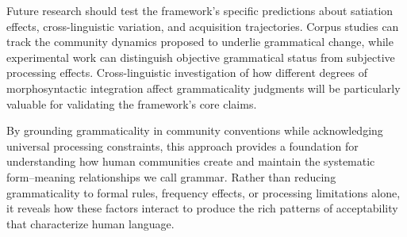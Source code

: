 \documentclass[12pt]{article}
\begin{document}
Future research should test the framework's specific predictions about satiation effects, cross-linguistic variation, and acquisition trajectories. Corpus studies can track the community dynamics proposed to underlie grammatical change, while experimental work can distinguish objective grammatical status from subjective processing effects. Cross-linguistic investigation of how different degrees of morphosyntactic integration affect grammaticality judgments will be particularly valuable for validating the framework's core claims.

By grounding grammaticality in community conventions while acknowledging universal processing constraints, this approach provides a foundation for understanding how human communities create and maintain the systematic form–meaning relationships we call grammar. Rather than reducing grammaticality to formal rules, frequency effects, or processing limitations alone, it reveals how these factors interact to produce the rich patterns of acceptability that characterize human language.

\newpage
\begin{sloppypar}
\printbibliography[title=References]
\end{sloppypar}
\end{document}
